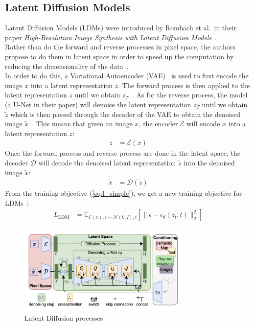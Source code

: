 \documentclass[twoside]{article}
\numberwithin{equation}{section}
\numberwithin{figure}{section}
\begin{document}
\subsection{Latent Diffusion Models}
Latent Diffusion Models (LDMs) were introduced by Rombach et al.\ in their paper \textit{High-Resolution Image Synthesis with Latent Diffusion Models}~\cite{rombach2022highresolution}. \\
Rather than do the forward and reverse processes in pixel space, the authors propose to do them in latent space in order to speed up the computation by reducing the dimensionality of the data~\cite{rombach2022highresolution}. \\
In order to do this, a Variational Autoencoder (VAE)~\cite{kingma2022autoencoding} is used to first encode the image $x$ into a latent representation $z$. The forward process is then applied to the latent representation $z$ until we obtain $z_T$~\cite{rombach2022highresolution}.
As for the reverse process, the model (a U-Net in their paper) will denoise the latent representation $z_T$ until we obtain $\tilde{z}$ which is then passed through the decoder of the VAE to obtain the denoised image $\tilde{x}$~\cite{rombach2022highresolution}.
This means that given an image $x$, the encoder $\mathcal{E}$ will encode $x$ into a latent representation $z$:
\begin{align}
  z &= \mathcal{E}(x)
\end{align}
Once the forward process and reverse process are done in the latent space, the decoder $\mathcal{D}$ will decode the denoised latent representation $\tilde{z}$ into the denoised image $\tilde{x}$:
\begin{align}
  \tilde{x} &= \mathcal{D}(\tilde{z})
\end{align}
From the training objective (\ref{eq:l_simple}), we get a new training objective for LDMs~\cite{rombach2022highresolution}:
\begin{align}
  L_{\text{LDM}} &= \mathbb{E}_{\mathcal{E}(x), \epsilon \sim \mathcal{N}(0, I), t} \left[ \| \epsilon - \epsilon_\theta (z_t, t) \|_2^2 \right]
\end{align}
\begin{figure}[h]
  \begin{center}
    \includegraphics[width=0.75\textwidth]{images/latentdiffusion.png}
    \caption{Latent Diffusion processes~\cite{rombach2022highresolution}}
  \end{center}
\end{figure}
\end{document}
